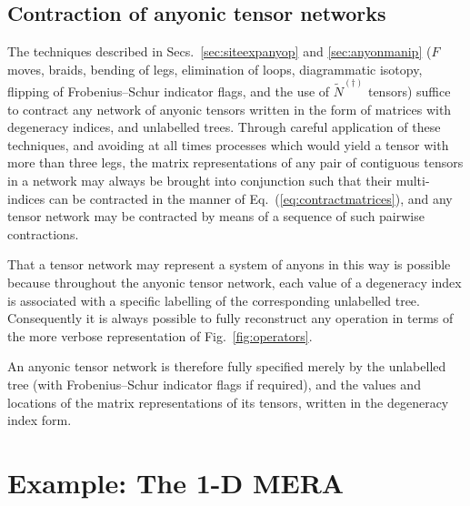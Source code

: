 \documentclass[aps,prb,reprint,superscriptaddress,amsfonts,amsmath,amssymb,showpacs,floatfix]{revtex4-1}
\newcommand{\eref}[1]{(\ref{#1})}
\newcommand{\fref}[1]{Fig.~\ref{#1}}
\begin{document}




\subsection{Contraction of anyonic tensor networks}


The techniques described in Secs.~\ref{sec:siteexpanyop} and \ref{sec:anyonmanip} ($F$ moves, braids, bending of legs, elimination of loops, diagrammatic isotopy, flipping of Frobenius--Schur indicator flags, and the use of $\tilde N^{(\dagger)}$ tensors) suffice to contract any network of anyonic tensors written in the form of matrices with degeneracy indices, and unlabelled trees. Through careful application of these techniques, and avoiding at all times processes which would yield a tensor with more than three legs, the matrix representations of any pair of contiguous tensors in a network may always be brought into conjunction such that their multi-indices can be contracted in the manner of Eq.~\eref{eq:contractmatrices}, and any tensor network may be contracted by means of a sequence of such pairwise contractions.

That a tensor network may represent a system of anyons in this way
is possible because throughout the anyonic tensor network, each value of a degeneracy index is associated with a specific labelling of the corresponding unlabelled tree. Consequently it is always possible %
to fully reconstruct any operation in terms of the more verbose representation of \fref{fig:operators}.

An anyonic tensor network is therefore fully specified merely by the unlabelled tree (with Frobenius--Schur indicator flags if required), and the values and locations of the matrix representations of its tensors, written in the degeneracy index form. %


\section{Example: The {1-D} MERA}
\end{document}
